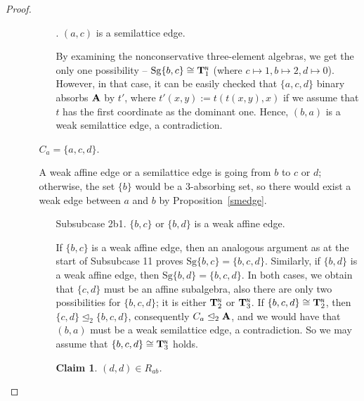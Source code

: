 \documentclass[11pt]{amsart}
\newcommand{\m}[1]{\mathbf{\uppercase{#1}}}
\newcommand{\n}{\scriptscriptstyle{\mathsf{N}}}
\theoremstyle{definition}
\theoremstyle{remark}
\theoremstyle{plain}
\newtheorem{claim}[thm]{Claim}
\begin{document}
\begin{proof}
\begin{enumerate}[wide, labelwidth=!,itemindent=!,labelindent=0pt]
\begin{enumerate}[wide, labelwidth=!,labelindent=0pt,itemindent=!]
\begin{enumerate}[wide, labelwidth=!,labelindent=0pt,itemindent=!]
\item[\sc{Subsubcase 2a2}.] $(a,c)$ is a semilattice edge.

By examining the nonconservative three-element algebras, we get the only one possibility -- $\mathrm{Sg}\{b,c\}\cong {\m T}_1^{\n}$ (where $c\mapsto 1, b\mapsto 2, d\mapsto 0$). However, in that case, it can be easily checked that $\{a,c,d\}$ binary absorbs $\m a$ by $t'$, where $t'(x,y):=t(t(x,y),x)$ if we assume that $t$ has the first coordinate as the dominant one. Hence, $(b,a)$ is a weak semilattice edge, a contradiction.
\end{enumerate}

    \item[{\sc{\textbf{Subcase 2b.}}}] $C_a=\{a,c,d\}$.

     A weak affine edge or a semilattice edge is going from $b$ to $c$ or $d$; otherwise, the set $\{b\}$ would be a $3$-absorbing set, so there would exist a weak edge between $a$ and $b$ by Proposition~\ref{smedge}. 

\begin{enumerate}[wide, labelwidth=!,labelindent=0pt,itemindent=!]
    \item[{\sc Subsubcase 2b1}.] $\{b,c\}$ or $\{b,d\}$ is a weak affine edge.

If $\{b,c\}$ is a weak affine edge, then an analogous argument as at the start of {\sc Subsubcase} 1{}1 proves $\mathrm{Sg}\{b,c\}=\{b,c,d\}$. Similarly, if $\{b,d\}$ is a weak affine edge, then $\mathrm{Sg}\{b,d\}=\{b,c,d\}$. In both cases, we obtain that $\{c,d\}$ must be an affine subalgebra, also there are only two possibilities for $\{b,c,d\}$; it is either ${\m T}_2^{\n}$ or ${\m T}_3^{\n}$. If $\{b,c,d\}\cong{\m T}_2^{\n}$, then $\{c,d\}\trianglelefteq_2\{b,c,d\}$, consequently $C_a\trianglelefteq_2\m a$, and we would have that $(b,a)$ must be a weak semilattice edge, a contradiction. So we may assume that $\{b,c,d\}\cong{\m T}_3^{\n}$ holds. \\

\begin{claim}
$(d,d)\in R_{ab}$. 
\end{claim}



\end{enumerate}
\end{enumerate}
\end{enumerate}
\end{proof}
\end{document}
